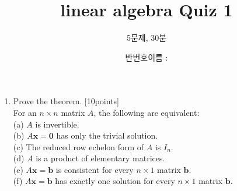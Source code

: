 \documentclass[12pt, a4paper]{article}
\title{linear algebra Quiz 1}
\author{5문제, 30분}
\date{ 반번호이름 : \underline{\hspace{5cm}} }
\begin{document}
\vspace{-2cm}
\maketitle 
\begin{enumerate}
    \item Prove the theorem. [10points]\\
    For an $n\times n$ matrix $A$, the following are equivalent:\\
    (a) $A$ is invertible.\\
    (b) $A\mathbf{x}=\mathbf{0}$ has only the trivial solution.\\
    (c) The reduced row echelon form of $A$ is $I_n$.\\
    (d) $A$ is a product of elementary matrices.\\
    (e) $A\mathbf{x}=\mathbf{b}$ is consistent for every $n\times1$ matrix $\mathbf{b}$.\\
    (f) $A\mathbf{x}=\mathbf{b}$ has exactly one solution for every $n\times1$ matrix $\mathbf{b}$. \\ \\ \\ \\ \\ \\ \\ \\ \\ \\ \\ \\ \\ \\ \\ \\ \\ \\ \\ \\ \\ \\ \\ \\ \\ \\ \\ \\ \\ \\ \\ \\ \\
    

\end{enumerate}
\end{document}
